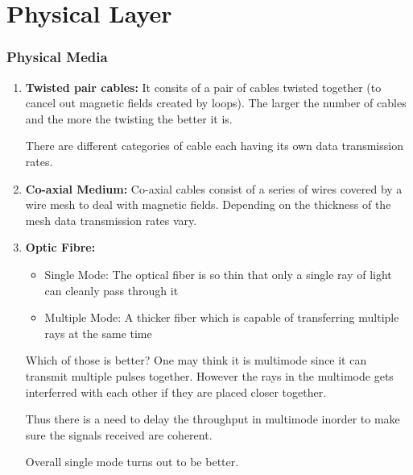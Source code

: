 \documentclass[12pt]{article}
\newcommand{\tbox}[1]{\noindent\fbox{\parbox{\textwidth}{#1}}}
\begin{document}
\part{Physical Layer}
\section{Physical Media}

\begin{enumerate}
    \item \textbf{Twisted pair cables:}
    It consits of a pair of cables twisted together (to cancel out magnetic fields created by loops). The larger the 
    number of cables and the more the twisting the better it is. 

    There are different categories of cable each having its own data transmission rates. 

    \item\textbf{Co-axial Medium:}
    Co-axial cables consist of a series of wires covered by a wire mesh to deal with magnetic fields. 
    Depending on the thickness of the mesh data transmission rates vary. 
    \item\textbf{Optic Fibre:}
    


        \begin{itemize}
            \item Single Mode: The optical fiber is so thin  that only a 
            single ray of light can cleanly pass through it
            \item Multiple Mode: A thicker fiber which is capable of transferring multiple rays 
            at the same time
        \end{itemize}


        Which of those is better? One may think it is multimode since it can transmit multiple pulses together. 
        However the rays in the multimode gets interferred with each other if they are placed closer together. 
        
        Thus there is a need to delay the throughput in multimode inorder to make sure the signals received are coherent.
        
        Overall single mode turns out to be better. 
    \end{enumerate}

\noindent\tbox{
    \begin{center}
    \textbf{\Huge Lecture 5}
    \end{center}
}
\end{document}
